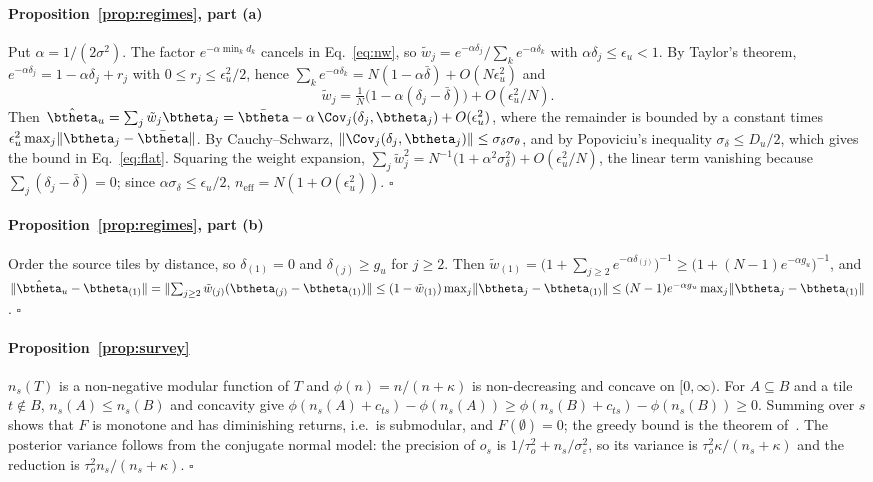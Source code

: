 \paragraph{Proposition~\ref{prop:regimes}, part (a)}
Put $\alpha=1/(2\sigma^{2})$. The factor $e^{-\alpha\min_k d_k}$ cancels in
Eq.~\eqref{eq:nw}, so $\tilde w_j=e^{-\alpha\delta_j}/\sum_k e^{-\alpha\delta_k}$
with $\alpha\delta_j\le\epsilon_u<1$. By Taylor's theorem,
$e^{-\alpha\delta_j}=1-\alpha\delta_j+r_j$ with $0\le r_j\le\epsilon_u^{2}/2$,
hence $\sum_k e^{-\alpha\delta_k}=N(1-\alpha\bar\delta)+O(N\epsilon_u^{2})$ and
\[
\tilde w_j=\tfrac1N\bigl(1-\alpha(\delta_j-\bar\delta)\bigr)+O(\epsilon_u^{2}/N).
\]
Then $\hat\btheta_u=\sum_j\tilde w_j\btheta_j=\bar\btheta-\alpha\,\Cov_j(\delta_j,\btheta_j)
+O(\epsilon_u^{2})$, where the remainder is bounded by a constant times
$\epsilon_u^{2}\max_j\lVert\btheta_j-\bar\btheta\rVert$. By Cauchy--Schwarz,
$\lVert\Cov_j(\delta_j,\btheta_j)\rVert\le\sigma_\delta\sigma_\theta$, and by
Popoviciu's inequality $\sigma_\delta\le D_u/2$, which gives the bound in
Eq.~\eqref{eq:flat}. Squaring the weight expansion,
$\sum_j\tilde w_j^{2}=N^{-1}\bigl(1+\alpha^{2}\sigma_\delta^{2}\bigr)+O(\epsilon_u^{2}/N)$,
the linear term vanishing because $\sum_j(\delta_j-\bar\delta)=0$; since
$\alpha\sigma_\delta\le\epsilon_u/2$, $n_{\mathrm{eff}}=N(1+O(\epsilon_u^{2}))$.
\hfill$\square$

\paragraph{Proposition~\ref{prop:regimes}, part (b)}
Order the source tiles by distance, so $\delta_{(1)}=0$ and
$\delta_{(j)}\ge g_u$ for $j\ge2$. Then
$\tilde w_{(1)}=\bigl(1+\sum_{j\ge2}e^{-\alpha\delta_{(j)}}\bigr)^{-1}
\ge\bigl(1+(N-1)e^{-\alpha g_u}\bigr)^{-1}$, and
$\lVert\hat\btheta_u-\btheta_{(1)}\rVert=\lVert\sum_{j\ge2}\tilde w_{(j)}(\btheta_{(j)}-\btheta_{(1)})\rVert
\le(1-\tilde w_{(1)})\max_j\lVert\btheta_j-\btheta_{(1)}\rVert
\le(N-1)e^{-\alpha g_u}\max_j\lVert\btheta_j-\btheta_{(1)}\rVert$.
\hfill$\square$

\paragraph{Proposition~\ref{prop:survey}}
$n_s(T)$ is a non-negative modular function of $T$ and
$\phi(n)=n/(n+\kappa)$ is non-decreasing and concave on $[0,\infty)$. For
$A\subseteq B$ and a tile $t\notin B$, $n_s(A)\le n_s(B)$ and concavity give
$\phi(n_s(A)+c_{ts})-\phi(n_s(A))\ge\phi(n_s(B)+c_{ts})-\phi(n_s(B))\ge0$.
Summing over $s$ shows that $F$ is monotone and has diminishing returns, i.e.\
is submodular, and $F(\emptyset)=0$; the greedy bound is the theorem
of~\cite{nemhauser1978}. The posterior variance follows from the conjugate
normal model: the precision of $o_s$ is $1/\tau_o^{2}+n_s/\sigma_\varepsilon^{2}$,
so its variance is $\tau_o^{2}\kappa/(n_s+\kappa)$ and the reduction is
$\tau_o^{2}n_s/(n_s+\kappa)$.
\hfill$\square$

